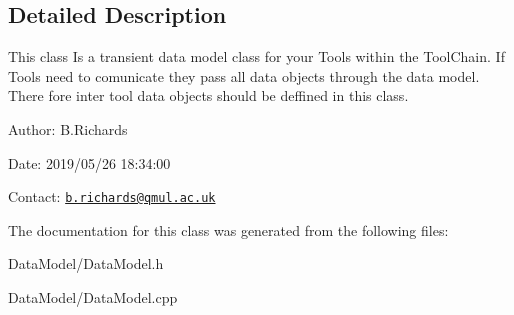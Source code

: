 \subsection{Detailed Description}
This class Is a transient data model class for your Tools within the Tool\-Chain. If Tools need to comunicate they pass all data objects through the data model. There fore inter tool data objects should be deffined in this class.

\begin{DoxyParagraph}{Author\-:}
B.\-Richards 
\end{DoxyParagraph}
\begin{DoxyParagraph}{Date\-:}
2019/05/26 18\-:34\-:00 
\end{DoxyParagraph}
Contact\-: \href{mailto:b.richards@qmul.ac.uk}{\tt b.\-richards@qmul.\-ac.\-uk} 

The documentation for this class was generated from the following files\-:\begin{DoxyCompactItemize}
\item 
Data\-Model/Data\-Model.\-h\item 
Data\-Model/Data\-Model.\-cpp\end{DoxyCompactItemize}
